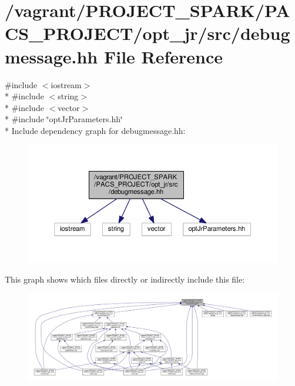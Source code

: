\hypertarget{debugmessage_8hh}{\section{/vagrant/\-P\-R\-O\-J\-E\-C\-T\-\_\-\-S\-P\-A\-R\-K/\-P\-A\-C\-S\-\_\-\-P\-R\-O\-J\-E\-C\-T/opt\-\_\-jr/src/debugmessage.hh File Reference}
\label{debugmessage_8hh}
}
{\ttfamily \#include $<$iostream$>$}\\*
{\ttfamily \#include $<$string$>$}\\*
{\ttfamily \#include $<$vector$>$}\\*
{\ttfamily \#include \char`\"{}opt\-Jr\-Parameters.\-hh\char`\"{}}\\*
Include dependency graph for debugmessage.\-hh\-:\nopagebreak
\begin{figure}[H]
\begin{center}
\leavevmode
\includegraphics[width=350pt]{debugmessage_8hh__incl}
\end{center}
\end{figure}
This graph shows which files directly or indirectly include this file\-:\nopagebreak
\begin{figure}[H]
\begin{center}
\leavevmode
\includegraphics[width=350pt]{debugmessage_8hh__dep__incl}
\end{center}
\end{figure}
